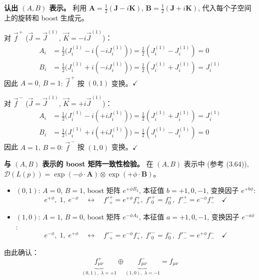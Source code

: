 \textbf{认出 $(A,B)$ 表示。}
利用 $\boldsymbol{A}=\frac{1}{2}(\boldsymbol{J}-i\boldsymbol{K})$,
$\boldsymbol{B}=\frac{1}{2}(\boldsymbol{J}+i\boldsymbol{K})$,
代入每个子空间上的旋转和 boost 生成元。

对 $\vec{f}^{\,+}$ ($\vec{J}=\vec{J}^{(1)}$, $\vec{K}=-i\vec{J}^{(1)}$)：
\begin{align}
    A_i &= \tfrac{1}{2}\bigl(J_i^{(1)} - i(-iJ_i^{(1)})\bigr) 
    = \tfrac{1}{2}(J_i^{(1)} - J_i^{(1)}) = 0 \\
    B_i &= \tfrac{1}{2}\bigl(J_i^{(1)} + i(-iJ_i^{(1)})\bigr) 
    = \tfrac{1}{2}(J_i^{(1)} + J_i^{(1)}) = J_i^{(1)}
\end{align}
因此 $A=0$, $B=1$: $\vec{f}^{\,+}$ 按 $(0,1)$ 变换。$\checkmark$

对 $\vec{f}^{\,-}$ ($\vec{J}=\vec{J}^{(1)}$, $\vec{K}=+i\vec{J}^{(1)}$)：
\begin{align}
    A_i &= \tfrac{1}{2}\bigl(J_i^{(1)} - i(+iJ_i^{(1)})\bigr) 
    = \tfrac{1}{2}(J_i^{(1)} + J_i^{(1)}) = J_i^{(1)} \\
    B_i &= \tfrac{1}{2}\bigl(J_i^{(1)} + i(+iJ_i^{(1)})\bigr) 
    = \tfrac{1}{2}(J_i^{(1)} - J_i^{(1)}) = 0
\end{align}
因此 $A=1$, $B=0$: $\vec{f}^{\,-}$ 按 $(1,0)$ 变换。$\checkmark$

\textbf{与 $(A,B)$ 表示的 boost 矩阵一致性检验。}
在 $(A,B)$ 表示中 (参考 (3.64)),
$\mathscr{D}(L(p)) = \exp(-\phi\cdot\boldsymbol{A})\otimes\exp(+\phi\cdot\boldsymbol{B})$。
\begin{itemize}
    \item $(0,1)$: $A=0$, $B=1$, boost 矩阵 $e^{+\phi B_3}$, 
    本征值 $b=+1,0,-1$, 变换因子 $e^{+b\phi}$:
    \begin{equation}
        e^{+\phi},\;1,\;e^{-\phi} \quad\longleftrightarrow\quad 
        f'^+_+ = e^{+\phi}f^+_+,\;f'^+_0 = f^+_0,\;f'^+_- = e^{-\phi}f^+_-
        \quad\checkmark
    \end{equation}
    
    \item $(1,0)$: $A=1$, $B=0$, boost 矩阵 $e^{-\phi A_3}$, 
    本征值 $a=+1,0,-1$, 变换因子 $e^{-a\phi}$:
    \begin{equation}
        e^{-\phi},\;1,\;e^{+\phi} \quad\longleftrightarrow\quad 
        f'^-_+ = e^{-\phi}f^-_+,\;f'^-_0 = f^-_0,\;f'^-_- = e^{+\phi}f^-_-
        \quad\checkmark
    \end{equation}
\end{itemize}

由此确认：
\begin{equation}
    \boxed{
    \underbrace{f^+_{\mu\nu}}_{(0,1),\;\lambda=+1} \oplus 
    \underbrace{f^-_{\mu\nu}}_{(1,0),\;\lambda=-1} = f_{\mu\nu}
    }
\end{equation}


